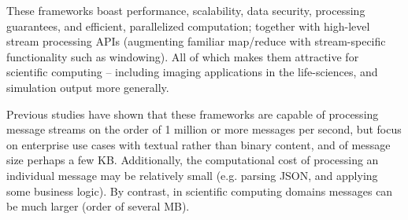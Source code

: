 \documentclass[conference]{IEEEtran}
\begin{document}

These frameworks boast 
performance, scalability, data security, processing guarantees, and efficient, parallelized computation; together with high-level stream processing APIs (augmenting familiar map/reduce with stream-specific functionality such as windowing). All of which makes them attractive for scientific computing -- including imaging applications in the life-sciences, and simulation output more generally.

Previous studies have shown that these frameworks are capable of processing message streams on the order of 1 million or more messages per second, but focus on enterprise use cases with textual rather than binary content, and of message size perhaps a few KB. Additionally, the computational cost of processing an individual message may be relatively small (e.g. parsing JSON, and applying some business logic). By contrast, in scientific computing domains messages can be much larger (order of several MB).


\end{document}
